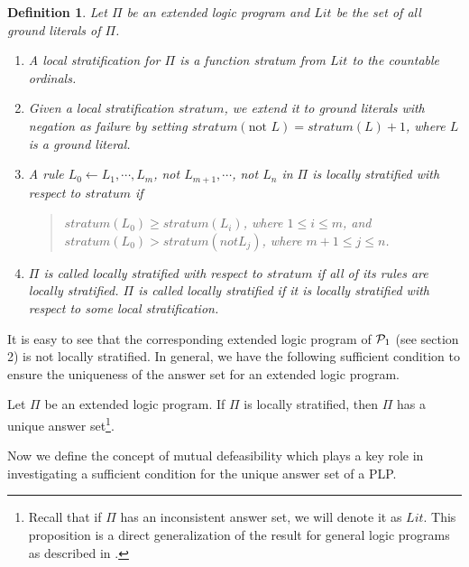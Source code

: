 \documentclass{tlp}
\newtheorem{definition}{Definition} %
\begin{document}
\begin{definition}
Let $\Pi$ be an extended logic program 
and $Lit$ be the set of all
ground literals of $\Pi$.
\begin{enumerate}
\item A {\em local stratification} for $\Pi$ is a function
{\em stratum} from $Lit$ to the countable ordinals.
\item Given a local stratification $stratum$, we extend it to ground literals with
negation as failure by setting
$stratum(\mbox{not }L)=stratum(L)+1$, where $L$ is a ground literal.
\item A rule
$L_{0}\leftarrow L_{1},\cdots, L_{m}$, not $L_{m+1},\cdots$, not $L_{n}$
in $\Pi$ is {\em locally stratified} with respect to
$stratum$ if
\begin{quote}
$stratum(L_{0})\geq stratum(L_{i})$, where $1\leq i\leq m$, and\\
$stratum(L_{0})> stratum(not L_{j})$, where $m+1\leq j\leq n$.
\end{quote}
\item $\Pi$ is called {\em locally stratified} with respect to $stratum$
if all of its rules are locally stratified. $\Pi$ is called
{\em locally stratified} if it is locally stratified with respect to
some local stratification.
\end{enumerate}
\end{definition}

It is easy to see that the corresponding extended logic 
program of ${\cal P}_{1}$ (see section 2) is not locally stratified. 
In general, we have the following sufficient condition to
ensure the uniqueness of the answer set for an extended logic program.

\begin{proposition}
Let $\Pi$ be an extended logic program. If $\Pi$ is
locally stratified,
then $\Pi$ has a unique answer set\footnote{Recall that
if $\Pi$ has an inconsistent answer set, we will denote it as
$Lit$. This proposition is a direct generalization of the result for 
general logic programs as described in \cite{gl:stable}.}.
\end{proposition}

Now we define the concept of mutual defeasibility
which plays a key role in investigating a sufficient condition for
the unique answer set of a PLP.
\end{document}
